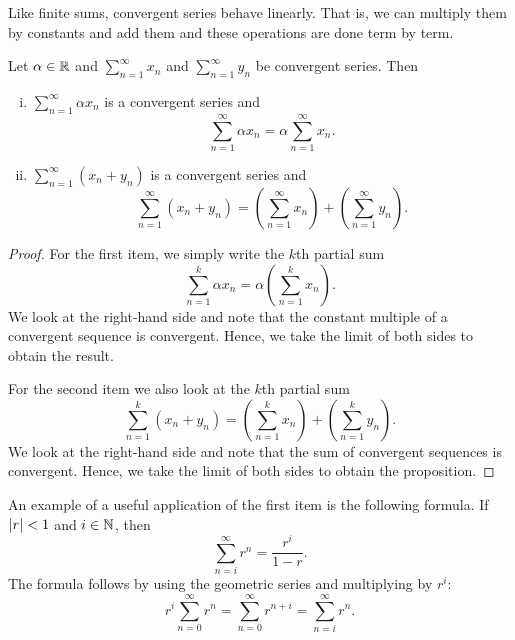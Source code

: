 Like finite sums, convergent series behave linearly.
That is, we can multiply them by constants
and add them and these operations are done term by term.

\begin{prop}
Let $\alpha \in {\mathbb{R}}$ and $\sum_{n=1}^\infty x_n$ and $\sum_{n=1}^\infty y_n$ be
convergent series.  Then
\begin{enumerate}[(i)]
\item
$\sum_{n=1}^\infty \alpha x_n$ is a convergent series and
\begin{equation*}
\sum_{n=1}^\infty \alpha x_n
=
\alpha \sum_{n=1}^\infty x_n .
\end{equation*}
\item
$\sum_{n=1}^\infty ( x_n + y_n )$ is a convergent series and
\begin{equation*}
\sum_{n=1}^\infty ( x_n + y_n ) 
=
\left( \sum_{n=1}^\infty x_n \right)
+
\left( \sum_{n=1}^\infty y_n \right) .
\end{equation*}
\end{enumerate}
\end{prop}

\begin{proof}
For the first item,
we simply write the $k$th partial sum
\begin{equation*}
\sum_{n=1}^k \alpha x_n
=
\alpha \left( \sum_{n=1}^k x_n \right) .
\end{equation*}
We look at the right-hand side and note that the constant multiple of
a convergent sequence
is convergent.  Hence, we take the limit of both sides to obtain
the result.

For the second item we also look at the
$k$th partial sum
\begin{equation*}
\sum_{n=1}^k ( x_n + y_n ) 
=
\left( \sum_{n=1}^k x_n \right)
+
\left( \sum_{n=1}^k y_n \right) .
\end{equation*}
We look at the right-hand side and note that the sum of convergent sequences
is convergent.  Hence, we take the limit of both sides to obtain
the proposition.
\end{proof}

An example of a useful application of the first item is the following
formula.  If $\lvert {r} \rvert < 1$ and $i \in {\mathbb{N}}$, then
\begin{equation*}
\sum_{n=i}^\infty r^n = \frac{r^i}{1-r} .
\end{equation*}
The formula follows by using the geometric series and multiplying by
$r^i$:
\begin{equation*}
r^i \sum_{n=0}^\infty r^n =
\sum_{n=0}^\infty r^{n+i}
=
\sum_{n=i}^\infty r^n .
\end{equation*}

